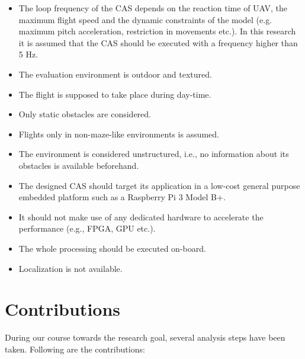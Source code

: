 \begin{itemize}
	\item The loop frequency of the \ac{CAS} depends on the reaction time of \ac{UAV}, the maximum flight speed and the dynamic constraints of the model (e.g. maximum pitch acceleration, restriction in movements etc.). In this research it is assumed that the \ac{CAS} should be executed with a frequency higher than 5 Hz.
	\item The evaluation environment is outdoor and textured.
	\item The flight is supposed to take place during day-time.
	\item Only static obstacles are considered.
	\item Flights only in non-maze-like environments is assumed.
	\item The environment is considered unstructured, i.e., no information about its obstacles is available beforehand.
	\item The designed \ac{CAS} should target its application in a low-cost general purpose embedded platform such as a Raspberry Pi 3 Model B+.
	\item It should not make use of any dedicated hardware to accelerate the performance (e.g., FPGA, GPU etc.).
	\item The whole processing should be executed on-board.
	\item Localization is not available.
\end{itemize}


\section{Contributions}

During our course towards the research goal, several analysis steps have been taken. Following are the contributions:

